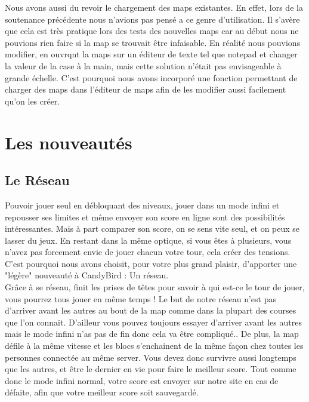 \documentclass [11pt]{report}
\begin{document}
		\indent Nous avons aussi du revoir le chargement des maps existantes. En effet, lors de la soutenance précédente nous n'avions pas pensé a ce genre d'utilisation. Il s'avère que cela est très pratique lors des tests des nouvelles maps car au début nous ne pouvions rien faire si la map se trouvait \^etre infaisable. En réalité nous pouvions modifier, en ouvrqnt la maps sur un éditeur de texte tel que notepad et changer la valeur de la case \`a la main, mais cette solution n'était pas envisageable \`a grande échelle. C'est pourquoi nous avons incorporé une fonction permettant de charger des maps dans l'éditeur de maps afin de les modifier aussi facilement qu'on les créer.\\
		
		
		\vspace{10mm}
		
		
\chapter{Les nouveautés}
	\section{Le Réseau}
		Pouvoir jouer seul en débloquant des niveaux, jouer dans un mode infini et repousser ses limites et même envoyer son score en ligne sont des possibilités intéressantes. Mais à part comparer son score, on se sens vite seul, et on peux se lasser du jeux. En restant dans la même optique, si vous êtes à plusieurs, vous n'avez pas forcement envie de jouer chacun votre tour, cela créer des tensions.\\
		
		C'est pourquoi nous avons choisit, pour votre plus grand plaisir, d'apporter une "légère" nouveauté à CandyBird : Un réseau.\\
		
		Grâce à se réseau, finit les prises de têtes pour savoir à qui est-ce le tour de jouer, vous pourrez tous jouer en même temps !
		Le but de notre réseau n'est pas d'arriver avant les autres au bout de la map comme dans la plupart des courses que l'on connait. D'ailleur vous pouvez toujours essayer d'arriver avant les autres mais le mode infini n'as pas de fin donc cela va être compliqué.. De plus, la map défile à la même vitesse et les blocs s'enchainent de la même façon chez toutes les personnes connectée au même server. Vous devez donc survivre aussi longtemps que les autres, et être le dernier en vie pour faire le meilleur score. Tout comme donc le mode infini normal, votre score est envoyer sur notre site en cas de défaite, afin que votre meilleur score soit sauvegardé.\\
		
\end{document}
